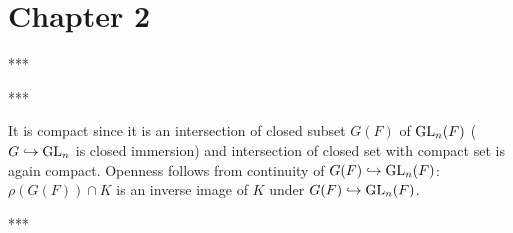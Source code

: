 \newpage
\section{Chapter 2}

\begin{problem} ***
\end{problem}
\begin{problem} ***
\end{problem}

\begin{problem}
It is compact since it is an intersection of closed subset $G(F)$ of $\operatorname{\mathrm{GL}}_{n}(F)$ ($G \hookrightarrow \operatorname{\mathrm{GL}}_{n}$ is closed immersion)
and intersection of closed set with compact set is again compact.
Openness follows from continuity of $G(F) \hookrightarrow \operatorname{\mathrm{GL}}_{n}(F)$: $\rho(G(F)) \cap K$ is an inverse image of $K$ under $G(F) \hookrightarrow \operatorname{\mathrm{GL}}_{n}(F)$.
\end{problem}

\begin{problem} ***
\end{problem}


